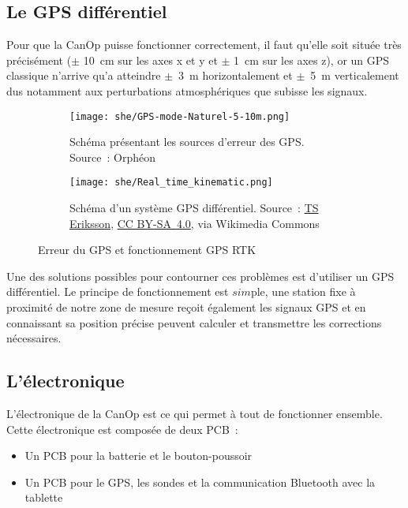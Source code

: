 \subsection{Le GPS différentiel}
\label{ssec_Gps_differenciel}
Pour que la CanOp puisse fonctionner correctement, il faut qu'elle soit située très précisément ($\pm$ 10~cm sur les axes x et y et $\pm$ 1~cm sur les axes z), or un GPS classique n'arrive qu’a atteindre $\pm$~3~m horizontalement et $\pm$~5~m verticalement \cite{GPS_accuracy} dus notamment aux perturbations atmosphériques que subisse les signaux. %
\begin{figure}[t]

    \begin{subfigure}[t]{0.5\textwidth}
        \centering
        \texttt{[image: she/GPS-mode-Naturel-5-10m.png]}

        \caption[Source d'erreur des GPS]{Schéma présentant les sources d'erreur des GPS. Source~: Orphéon}
        \label{fig_GPS_error_source}
    \end{subfigure}
    \begin{subfigure}[t]{0.5\textwidth}
        \centering
        \texttt{[image: she/Real\_time\_kinematic.png]}

        \caption[Shema d'un systeme GPS differenciel]{Schéma d'un système GPS différentiel. Source~: \href{https://commons.wikimedia.org/wiki/File:Real_time_kinematic.svg}{TS Eriksson}, \href{https://creativecommons.org/licenses/by-sa/4.0}{CC BY-SA~4.0}, via Wikimedia Commons}
        \label{fig_RTK}
    \end{subfigure}
    \caption{Erreur du GPS et fonctionnement GPS RTK}
\end{figure}

Une des solutions possibles pour contourner ces problèmes est d'utiliser un GPS différentiel. Le principe de fonctionnement est $ sim$ple, une station fixe à proximité de notre zone de mesure reçoit également les signaux GPS et en connaissant sa position précise peuvent calculer et transmettre les corrections nécessaires. \cite{site:GPS_diff} %

\subsection{L'électronique}

L'électronique de la CanOp est ce qui permet à tout de fonctionner ensemble. Cette électronique est composée de deux PCB~:
\begin{itemize}
    \item Un PCB pour la batterie et le bouton-poussoir
    \item Un PCB pour le GPS, les sondes et la communication Bluetooth avec la tablette
\end{itemize}

